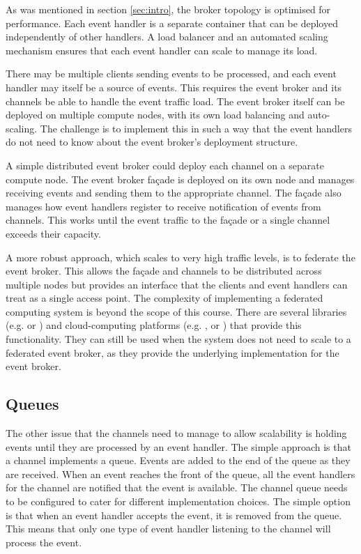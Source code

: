 As was mentioned in section \ref{sec:intro}, the broker topology is optimised for performance.
Each event handler is a separate container that can be deployed independently of other handlers.
A load balancer and an automated scaling mechanism ensures that each event handler can scale to manage its load.

There may be multiple clients sending events to be processed,
and each event handler may itself be a source of events.
This requires the event broker and its channels be able to handle the event traffic load.
The event broker itself can be deployed on multiple compute nodes, with its own load balancing and auto-scaling.
The challenge is to implement this in such a way that the event handlers do not need to know about the event broker's deployment structure.

A simple distributed event broker could deploy each channel on a separate compute node.
The event broker façade is deployed on its own node and manages receiving events and sending them to the appropriate channel.
The façade also manages how event handlers register to receive notification of events from channels.
This works until the event traffic to the façade or a single channel exceeds their capacity.

A more robust approach, which scales to very high traffic levels, is to federate the event broker.
This allows the façade and channels to be distributed across multiple nodes
but provides an interface that the clients and event handlers can treat as a single access point.
The complexity of implementing a federated computing system is beyond the scope of this course.
There are several libraries (e.g.  or )
and cloud-computing platforms (e.g. ,
 or
) that provide this functionality.
They can still be used when the system does not need to scale to a federated event broker,
as they provide the underlying implementation for the event broker.

\subsection{Queues}

The other issue that the channels need to manage to allow scalability is holding events until they are processed by an event handler.
The simple approach is that a channel implements a queue.
Events are added to the end of the queue as they are received.
When an event reaches the front of the queue, all the event handlers for the channel are notified that the event is available.
The channel queue needs to be configured to cater for different implementation choices.
The simple option is that when an event handler accepts the event, it is removed from the queue.
This means that only one type of event handler listening to the channel will process the event.

